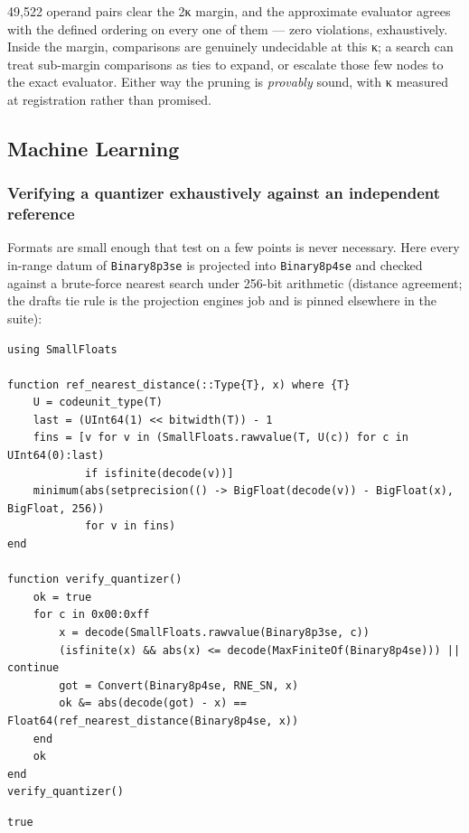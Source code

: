 49,522 operand pairs clear the 2κ margin, and the approximate evaluator agrees with the defined ordering on every one of them — zero violations, exhaustively. Inside the margin, comparisons are genuinely undecidable at this κ; a search can treat sub-margin comparisons as ties to expand, or escalate those few nodes to the exact evaluator. Either way the pruning is \emph{provably} sound, with κ measured at registration rather than promised.



\subsection{Machine Learning}



\label{11381515430689351323-dup2}{}


\subsubsection{Verifying a quantizer exhaustively against an independent reference}



\label{15080892262823953367}{}


Formats are small enough that {\textquotedbl}test on a few points{\textquotedbl} is never necessary. Here every in-range datum of \texttt{Binary8p3se} is projected into \texttt{Binary8p4se} and checked against a brute-force nearest search under 256-bit arithmetic (distance agreement; the draft{\textquotesingle}s tie rule is the projection engine{\textquotesingle}s job and is pinned elsewhere in the suite):




\nopagebreak[4]
\begin{minipage}{\linewidth}
\begin{verbatim}
using SmallFloats

function ref_nearest_distance(::Type{T}, x) where {T}
    U = codeunit_type(T)
    last = (UInt64(1) << bitwidth(T)) - 1
    fins = [v for v in (SmallFloats.rawvalue(T, U(c)) for c in UInt64(0):last)
            if isfinite(decode(v))]
    minimum(abs(setprecision(() -> BigFloat(decode(v)) - BigFloat(x), BigFloat, 256))
            for v in fins)
end

function verify_quantizer()
    ok = true
    for c in 0x00:0xff
        x = decode(SmallFloats.rawvalue(Binary8p3se, c))
        (isfinite(x) && abs(x) <= decode(MaxFiniteOf(Binary8p4se))) || continue
        got = Convert(Binary8p4se, RNE_SN, x)
        ok &= abs(decode(got) - x) == Float64(ref_nearest_distance(Binary8p4se, x))
    end
    ok
end
verify_quantizer()
\end{verbatim}




\begin{verbatim}
true
\end{verbatim}
\end{minipage}





